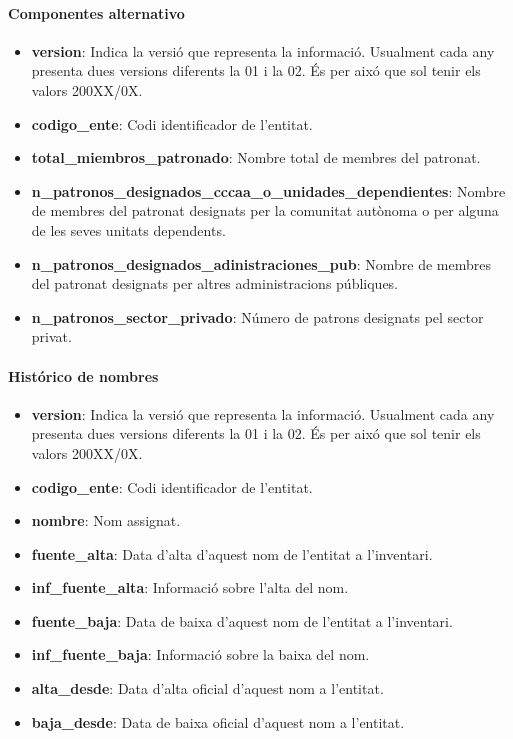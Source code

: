 \documentclass[12pt]{article}
\begin{document}
\paragraph{Componentes alternativo\\}
\begin{itemize}
    \item \textbf{version}: Indica la versió que representa la informació. Usualment cada any presenta dues versions diferents la 01 i la 02. És per aixó que sol tenir els valors 200XX/0X.
    \item \textbf{codigo\_ente}: Codi identificador de l'entitat.
    \item \textbf{total\_miembros\_patronado}: Nombre total de membres del patronat.
    \item \textbf{n\_patronos\_designados\_cccaa\_o\_unidades\_dependientes}: Nombre de membres del patronat designats per la comunitat autònoma o per alguna de les seves unitats dependents.
    \item \textbf{n\_patronos\_designados\_adinistraciones\_pub}: Nombre de membres del patronat designats per altres administracions públiques.
    \item \textbf{n\_patronos\_sector\_privado}: Número de patrons designats pel sector privat.
\end{itemize}

\paragraph{Histórico de nombres\\}
\begin{itemize}
    \item \textbf{version}: Indica la versió que representa la informació. Usualment cada any presenta dues versions diferents la 01 i la 02. És per aixó que sol tenir els valors 200XX/0X.
    \item \textbf{codigo\_ente}: Codi identificador de l'entitat.
    \item \textbf{nombre}: Nom assignat.
    \item \textbf{fuente\_alta}: Data d'alta d'aquest nom de l'entitat a l'inventari.
    \item \textbf{inf\_fuente\_alta}: Informació sobre l'alta del nom.
    \item \textbf{fuente\_baja}: Data de baixa d'aquest nom de l'entitat a l'inventari.
    \item \textbf{inf\_fuente\_baja}: Informació sobre la baixa del nom.
    \item \textbf{alta\_desde}: Data d'alta oficial d'aquest nom a l'entitat.
    \item \textbf{baja\_desde}: Data de baixa oficial d'aquest nom a l'entitat.
\end{itemize}
\end{document}
